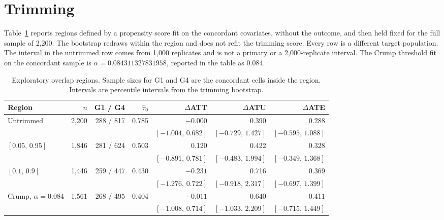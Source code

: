 \documentclass[twoside,11pt]{article}
\begin{document}
\section{Trimming}
\label{sec:trim}

Table~\ref{tab:trim} reports regions defined by a propensity score fit on the concordant covariates, without the outcome, and then held fixed for the full sample of 2{,}200. The bootstrap redraws within the region and does not refit the trimming score. Every row is a different target population. The interval in the untrimmed row comes from 1{,}000 replicates and is not a primary or a 2{,}000-replicate interval. The Crump threshold fit on the concordant sample is $\alpha=0.084311327831958$, reported in the table as 0.084.

\begin{table}[ht]
\centering
\caption{Exploratory overlap regions. Sample sizes for G1 and G4 are the concordant cells inside the region. Intervals are percentile intervals from the trimming bootstrap.}
\label{tab:trim}
\small
\setlength{\tabcolsep}{4pt}
\begin{tabular}{lrrrrrr}
\toprule
Region & $n$ & G1 / G4 & $\widehat\tau_0$ & $\Delta$ATT & $\Delta$ATU & $\Delta$ATE \\
\midrule
Untrimmed & 2{,}200 & 288 / 817 & 0.785 & $-0.000$ & 0.390 & 0.288 \\
 & & & & $[-1.004,\,0.682]$ & $[-0.729,\,1.427]$ & $[-0.595,\,1.088]$ \\
$[0.05,\,0.95]$ & 1{,}846 & 281 / 624 & 0.503 & 0.120 & 0.422 & 0.328 \\
 & & & & $[-0.891,\,0.781]$ & $[-0.483,\,1.994]$ & $[-0.349,\,1.368]$ \\
$[0.1,\,0.9]$ & 1{,}446 & 259 / 447 & 0.430 & $-0.231$ & 0.716 & 0.369 \\
 & & & & $[-1.276,\,0.722]$ & $[-0.918,\,2.317]$ & $[-0.697,\,1.399]$ \\
Crump, $\alpha=0.084$ & 1{,}561 & 268 / 495 & 0.404 & $-0.011$ & 0.640 & 0.411 \\
 & & & & $[-1.008,\,0.714]$ & $[-1.033,\,2.209]$ & $[-0.715,\,1.449]$ \\
\bottomrule
\end{tabular}
\end{table}





\end{document}
